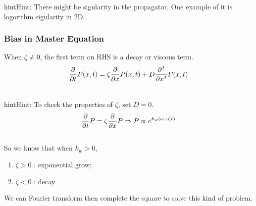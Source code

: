 \documentclass[letterpaper,10pt,english]{sphinxmanual}
\begin{document}
\begin{notice}{hint}{Hint:}
There might be sigularity in the propagator. One example of it is logorithm sigularity in 2D.
\end{notice}


\subsubsection{Bias in Master Equation}
\label{nonequilibrium/week12:bias-in-master-equation}
When $\zeta\neq 0$, the first term on RHS is a decay or viscous term.
\begin{gather}
\begin{split}\frac{\partial}{\partial t}P(x,t) = \zeta \frac{\partial}{\partial x}P(x,t) + D\frac{\partial^2}{\partial x^2}P(x,t)\end{split}\notag\\\begin{split}\end{split}\notag
\end{gather}
\begin{notice}{hint}{Hint:}
To check the properties of $\zeta$, set $D=0$.
\begin{gather}
\begin{split}\frac{\partial}{\partial t} P = \zeta \frac{\partial}{\partial x} P \Rightarrow P\propto e^{k_w(\omega + \zeta t)}\end{split}\notag\\\begin{split}\end{split}\notag
\end{gather}
So we know that when $k_w > 0$,
\begin{enumerate}
\item {} 
$\zeta > 0$ : exponential grow;

\item {} 
$\zeta < 0$ : decay

\end{enumerate}
\end{notice}

We can Fourier transform then complete the square to solve this kind of problem.
\end{document}
